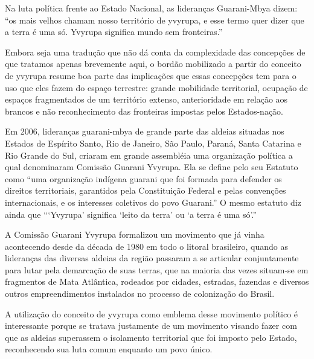 \documentclass{article}
\begin{document}
Na luta pol\'itica frente ao Estado Nacional, as lideran\c{c}as
Guarani-Mbya dizem: {\textquotedblleft}os mais velhos chamam nosso
territ\'orio de yvyrupa, e esse termo quer dizer que a terra \'e uma
s\'o. Yvyrupa significa mundo sem fronteiras.{\textquotedblright}

Embora seja uma tradu\c{c}\~ao que n\~ao d\'a conta da complexidade das
concep\c{c}\~oes de que tratamos apenas brevemente aqui, o bord\~ao
mobilizado a partir do conceito de yvyrupa resume boa parte das
implica\c{c}\~oes que essas concep\c{c}\~oes tem para o uso que eles
fazem do espa\c{c}o terrestre: grande mobilidade territorial,
ocupa\c{c}\~ao de espa\c{c}os fragmentados de um territ\'orio extenso,
anterioridade em rela\c{c}\~ao aos brancos e n\~ao reconhecimento das
fronteiras impostas pelos Estados-na\c{c}\~ao.

Em 2006, lideran\c{c}as guarani-mbya de grande parte das aldeias
situadas nos Estados de Esp\'irito Santo, Rio de Janeiro, S\~ao Paulo,
Paran\'a, Santa Catarina e Rio Grande do Sul, criaram em grande
assembl\'eia uma organiza\c{c}\~ao pol\'itica a qual denominaram
Comiss\~ao Guarani Yvyrupa. Ela se define pelo seu Estatuto como
{\textquotedblleft}uma organiza\c{c}\~ao ind\'igena guarani que foi
formada para defender os direitos territoriais, garantidos pela
Constitui\c{c}\~ao Federal e pelas conven\c{c}\~oes internacionais, e
os interesses coletivos do povo Guarani.{\textquotedblright} O mesmo
estatuto diz ainda que
{\textquotedblleft}{\textquoteleft}Yvyrupa{\textquoteright} significa
{\textquoteleft}leito da terra{\textquoteright} ou {\textquoteleft}a
terra \'e uma s\'o{\textquoteright}.{\textquotedblright}

A Comiss\~ao Guarani Yvyrupa formalizou um movimento que j\'a vinha
acontecendo desde da d\'ecada de 1980 em todo o litoral brasileiro,
quando as lideran\c{c}as das diversas aldeias da regi\~ao passaram a se
articular conjuntamente para lutar pela demarca\c{c}\~ao de suas
terras, que na maioria das vezes situam-se em fragmentos de Mata
Atl\^antica, rodeados por cidades, estradas, fazendas e diversos outros
empreendimentos instalados no processo de coloniza\c{c}\~ao do Brasil.

A utiliza\c{c}\~ao do conceito de yvyrupa como emblema desse movimento
pol\'itico \'e interessante porque se tratava justamente de um
movimento visando fazer com que as aldeias superassem o isolamento
territorial que foi imposto pelo Estado, reconhecendo sua luta comum
enquanto um povo \'unico.
\end{document}
